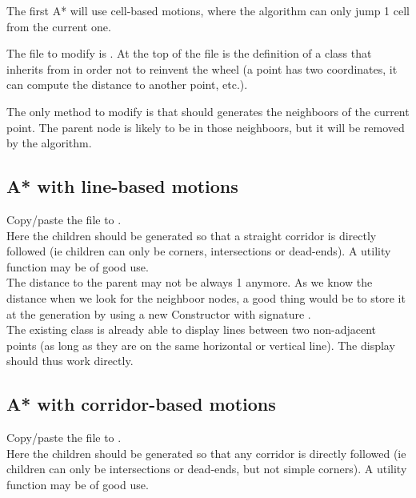 \documentclass{ecnreport}
\begin{document}
The first A* will use cell-based motions, where the algorithm can only jump 1 cell from the current one.

The file to modify is .
At the top of the file is the definition of a  class
that inherits from  in order not to reinvent the wheel (a point has two coordinates, it can compute the distance to
another point, etc.).

The only method to modify is  that should generates the neighboors of the current point.
The parent node is likely to be in those neighboors, but it will be removed by the algorithm. 

\subsection{A* with line-based motions}

Copy/paste the  file to .\\

Here the children should be generated so that a straight corridor is directly followed (ie children can only be corners, intersections or dead-ends).
A utility function  may be of good use.\\

The distance to the parent may not be always 1 anymore. As we know the distance when we look for the neighboor nodes, a good thing would be to store it 
at the generation by using a new Constructor with signature .\\

The existing  class is already able to display lines between two non-adjacent points (as long as they are on the same horizontal or
vertical line). The display should thus work directly.

\subsection{A* with corridor-based motions}

Copy/paste the  file to .\\

Here the children should be generated so that any corridor is directly followed (ie children can only be intersections or dead-ends, but
not simple corners).
A utility function  may be of good use.\\
\end{document}
